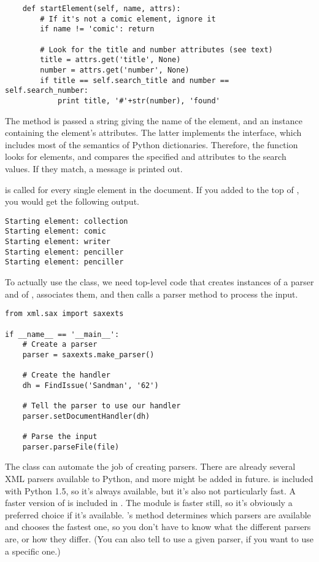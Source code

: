 \documentclass{howto}
\newcommand{\element}[1]{\code{#1}}
\newcommand{\attribute}[1]{\code{#1}}
\begin{document}
\begin{verbatim}
    def startElement(self, name, attrs):
        # If it's not a comic element, ignore it
        if name != 'comic': return

        # Look for the title and number attributes (see text)
        title = attrs.get('title', None)
        number = attrs.get('number', None)
        if title == self.search_title and number == self.search_number:
            print title, '#'+str(number), 'found'
\end{verbatim}

The  method is passed a string giving the name
of the element, and an instance containing the element's attributes.
The latter implements the  interface, which
includes most of the semantics of Python dictionaries.  Therefore, the 
function looks for \element{comic} elements, and compares the
specified \attribute{title} and \attribute{number} attributes to the
search values.  If they match, a message is printed out.

 is called for every single element in the
document.  If you added  to the
top of  , you would get the following output.

\begin{verbatim}
Starting element: collection
Starting element: comic
Starting element: writer
Starting element: penciller
Starting element: penciller
\end{verbatim}

To actually use the class, we need top-level code that creates 
instances of a parser and of , associates them, and
then calls a parser method to process the input.

\begin{verbatim}
from xml.sax import saxexts

if __name__ == '__main__':
    # Create a parser
    parser = saxexts.make_parser()

    # Create the handler
    dh = FindIssue('Sandman', '62')

    # Tell the parser to use our handler
    parser.setDocumentHandler(dh)

    # Parse the input
    parser.parseFile(file)
\end{verbatim}

The  class can automate the job of creating
parsers.  There are already several XML parsers available to Python,
and more might be added in future.   is included with
Python 1.5, so it's always available, but it's also not particularly
fast.  A faster version of  is included in
.  The  module is faster still, so
it's obviously a preferred choice if it's available.
's  method determines
which parsers are available and chooses the fastest one, so you don't
have to know what the different parsers are, or how they differ. (You
can also tell  to use a given parser, if you want
to use a specific one.)
\end{document}
